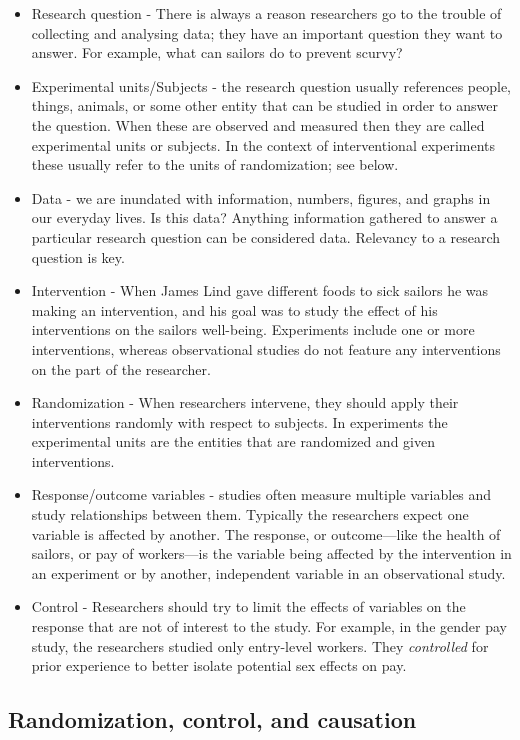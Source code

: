 \documentclass[
]{book}
\providecommand{\tightlist}{%
  \setlength{\itemsep}{0pt}\setlength{\parskip}{0pt}}
\begin{document}
\begin{itemize}
\tightlist
\item
  Research question - There is always a reason researchers go to the trouble of collecting and analysing data; they have an important question they want to answer. For example, what can sailors do to prevent scurvy?
\item
  Experimental units/Subjects - the research question usually references people, things, animals, or some other entity that can be studied in order to answer the question. When these are observed and measured then they are called experimental units or subjects. In the context of interventional experiments these usually refer to the units of randomization; see below.
\item
  Data - we are inundated with information, numbers, figures, and graphs in our everyday lives. Is this data? Anything information gathered to answer a particular research question can be considered data. Relevancy to a research question is key.
\item
  Intervention - When James Lind gave different foods to sick sailors he was making an intervention, and his goal was to study the effect of his interventions on the sailors well-being. Experiments include one or more interventions, whereas observational studies do not feature any interventions on the part of the researcher.
\item
  Randomization - When researchers intervene, they should apply their interventions randomly with respect to subjects. In experiments the experimental units are the entities that are randomized and given interventions.
\item
  Response/outcome variables - studies often measure multiple variables and study relationships between them. Typically the researchers expect one variable is affected by another. The response, or outcome---like the health of sailors, or pay of workers---is the variable being affected by the intervention in an experiment or by another, independent variable in an observational study.
\item
  Control - Researchers should try to limit the effects of variables on the response that are not of interest to the study. For example, in the gender pay study, the researchers studied only entry-level workers. They \emph{controlled} for prior experience to better isolate potential sex effects on pay.
\end{itemize}

\hypertarget{randomization-control-and-causation}{%
\subsection{Randomization, control, and causation}\label{randomization-control-and-causation}}
\end{document}
